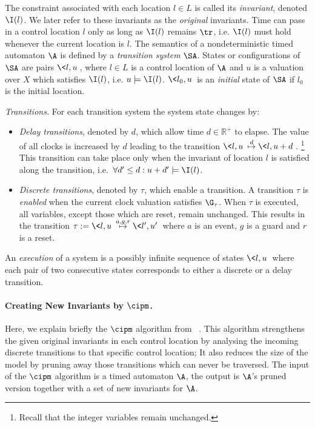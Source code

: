 \documentclass{eptcs}
\begin{document}
The constraint associated with each location $l\in L$ is called its {\em
  invariant}, denoted $\I(l)$. We later refer to these invariants as the {\em
  original} invariants. Time can pass in a control location $l$ only as long
as $\I(l)$ remains $\tr$, i.e. $\I(l)$ must hold whenever the current location
is $l$.
The semantics of a nondeterministic timed automaton $\A$ is defined by a {\em transition
  system} $\SA$. 
States or configurations of $\SA$ are
pairs $\<l,u\>$, where $l\in L$ is a control location of $\A$ and $u$ is a
valuation over $X$ which satisfies $\I(l)$, i.e. $u\models \I(l)$. 
$\<l_0,u\>$ is an {\em initial} state of $\SA$ if $l_0$ is the initial location.

\noindent
{\em Transitions.} 
For each transition system the system state changes by:\begin{itemize}

\item {\em Delay transitions}, denoted by $d$, which allow time $d{\in} {\mathbb{R^+}}$ to 
elapse. The value of all clocks is increased by $d$ leading to the
transition $\< l,u\> \stackrel{d}{\mapsto} \< l,u+d\>$.
\footnote{Recall that the integer variables remain unchanged.} 
This transition can take place only when the invariant of location $l$ is
satisfied along the transition, i.e.\ $\forall d'\leq d: u+d'\models \I(l)$.

\item {\em Discrete transitions}, denoted by $\tau$, which enable a transition. A transition
  $\tau$ is {\em enabled} when the current clock valuation satisfies
  $\G_{\tau}$.  When $\tau$ is executed, all variables, except those which are
  reset, remain unchanged. This results in the transition $\tau:= \< l,u\>
  \stackrel{a,g,r}{\mapsto} \< l',u'\>$ where $a$ is an event, $g$ is a guard
  and $r$ is a reset.
\end{itemize}
An {\em execution} of a system is a possibly infinite sequence of
states 
$\< l,u\>$ where each pair of two consecutive states corresponds to
either a discrete or a delay transition.









\paragraph{Creating New Invariants by $\cipm$.}
Here, we explain briefly the $\cipm$ algorithm from ~\cite{BaLeSm09}. This
algorithm strengthens the given original invariants in each control location
by analysing the incoming discrete transitions to that specific control
location; It also reduces the size of the model by pruning away those
transitions which can never be traversed.
The input of the $\cipm$ algorithm is a timed automaton $\A$, the output is
$\A$'s pruned version together with a set of new invariants for $\A$.
\end{document}
